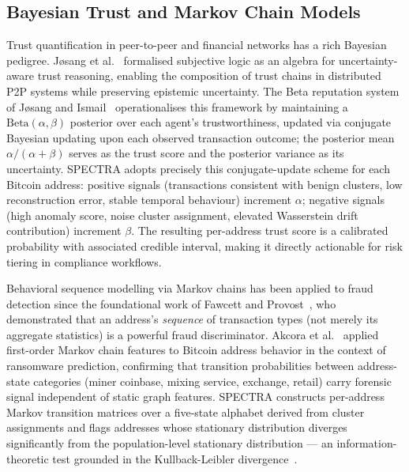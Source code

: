 \documentclass[journal]{IEEEtran}
\begin{document}
\subsection{Bayesian Trust and Markov Chain Models}
\label{subsec:bayesian}

Trust quantification in peer-to-peer and financial networks has a rich Bayesian
pedigree.  J{\o}sang et al.~\cite{Josang2007} formalised subjective logic as
an algebra for uncertainty-aware trust reasoning, enabling the composition of
trust chains in distributed P2P systems while preserving epistemic uncertainty.
The Beta reputation system of J{\o}sang and Ismail~\cite{JosangIsmail2002}
operationalises this framework by maintaining a $\text{Beta}(\alpha, \beta)$
posterior over each agent's trustworthiness, updated via conjugate Bayesian
updating upon each observed transaction outcome; the posterior mean $\alpha /
(\alpha + \beta)$ serves as the trust score and the posterior variance as its
uncertainty.  SPECTRA adopts precisely this conjugate-update scheme for each
Bitcoin address: positive signals (transactions consistent with benign clusters,
low reconstruction error, stable temporal behaviour) increment $\alpha$;
negative signals (high anomaly score, noise cluster assignment, elevated
Wasserstein drift contribution) increment $\beta$.  The resulting per-address
trust score is a calibrated probability with associated credible interval,
making it directly actionable for risk tiering in compliance workflows.

Behavioral sequence modelling via Markov chains has been applied to fraud
detection since the foundational work of Fawcett and Provost~\cite{FawcettProvost1997},
who demonstrated that an address's \emph{sequence} of transaction types (not
merely its aggregate statistics) is a powerful fraud discriminator.  Akcora et
al.~\cite{Akcora2022} applied first-order Markov chain features to Bitcoin
address behavior in the context of ransomware prediction, confirming that
transition probabilities between address-state categories (miner coinbase,
mixing service, exchange, retail) carry forensic signal independent of static
graph features.  SPECTRA constructs per-address Markov transition matrices over
a five-state alphabet derived from cluster assignments and flags addresses whose
stationary distribution diverges significantly from the population-level
stationary distribution --- an information-theoretic test grounded in the
Kullback-Leibler divergence~\cite{Kraskov2004}.
\end{document}
